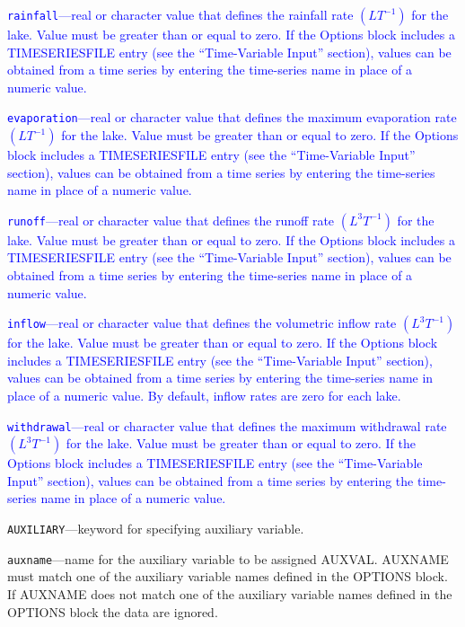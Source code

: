 \begin{description}
\item \textcolor{blue}{\texttt{rainfall}---real or character value that defines the rainfall rate $(LT^{-1})$ for the lake. Value must be greater than or equal to zero. If the Options block includes a TIMESERIESFILE entry (see the ``Time-Variable Input'' section), values can be obtained from a time series by entering the time-series name in place of a numeric value.}

\item \textcolor{blue}{\texttt{evaporation}---real or character value that defines the maximum evaporation rate $(LT^{-1})$ for the lake. Value must be greater than or equal to zero. If the Options block includes a TIMESERIESFILE entry (see the ``Time-Variable Input'' section), values can be obtained from a time series by entering the time-series name in place of a numeric value.}

\item \textcolor{blue}{\texttt{runoff}---real or character value that defines the runoff rate $(L^3 T^{-1})$ for the lake. Value must be greater than or equal to zero. If the Options block includes a TIMESERIESFILE entry (see the ``Time-Variable Input'' section), values can be obtained from a time series by entering the time-series name in place of a numeric value.}

\item \textcolor{blue}{\texttt{inflow}---real or character value that defines the volumetric inflow rate $(L^3 T^{-1})$ for the lake. Value must be greater than or equal to zero. If the Options block includes a TIMESERIESFILE entry (see the ``Time-Variable Input'' section), values can be obtained from a time series by entering the time-series name in place of a numeric value. By default, inflow rates are zero for each lake.}

\item \textcolor{blue}{\texttt{withdrawal}---real or character value that defines the maximum withdrawal rate $(L^3 T^{-1})$ for the lake. Value must be greater than or equal to zero. If the Options block includes a TIMESERIESFILE entry (see the ``Time-Variable Input'' section), values can be obtained from a time series by entering the time-series name in place of a numeric value.}

\item \texttt{AUXILIARY}---keyword for specifying auxiliary variable.

\item \texttt{auxname}---name for the auxiliary variable to be assigned AUXVAL.  AUXNAME must match one of the auxiliary variable names defined in the OPTIONS block. If AUXNAME does not match one of the auxiliary variable names defined in the OPTIONS block the data are ignored.


\end{description}
